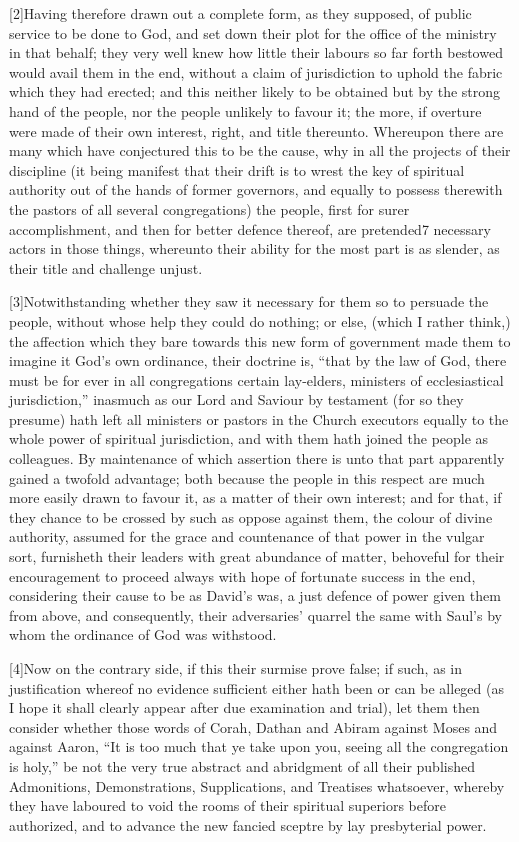 [2]Having therefore drawn out a complete form, as they supposed, of public service to be done to God, and set down their plot for the office of the ministry in that behalf; they very well knew how little their labours so far forth bestowed would avail them in the end, without a claim of jurisdiction to uphold the fabric which they had erected; and this neither likely to be obtained but by the strong hand of the people, nor the people unlikely to favour it; the more, if overture were made of their own interest, right, and title thereunto. Whereupon there are many which have conjectured this to be the cause, why in all the projects of their discipline (it being manifest that their drift is to wrest the key of spiritual authority out of the hands of former governors, and equally to possess therewith the pastors of all several congregations) the people, first for surer accomplishment, and then for better defence thereof, are pretended7 necessary actors in those things, whereunto their ability for the most part is as slender, as their title and challenge unjust.

[3]Notwithstanding whether they saw it necessary for them so to persuade the people,  without whose help they could do nothing; or else, (which I rather think,) the affection which they bare towards this new form of government made them to imagine it God’s own ordinance, their doctrine is, “that by the law of God, there must be for ever in all congregations certain lay-elders, ministers of ecclesiastical jurisdiction,” inasmuch as our Lord and Saviour by testament (for so they presume) hath left all ministers or pastors in the Church executors equally to the whole power of spiritual jurisdiction, and with them hath joined the people as colleagues. By maintenance of which assertion there is unto that part apparently gained a twofold advantage; both because the people in this respect are much more easily drawn to favour it, as a matter of their own interest; and for that, if they chance to be crossed by such as oppose against them, the colour of divine authority, assumed for the grace and countenance of that power in the vulgar sort, furnisheth their leaders with great abundance of matter, behoveful for their encouragement to proceed always with hope of fortunate success in the end, considering their cause to be as David’s was, a just defence of power given them from above, and consequently, their adversaries’ quarrel the same with Saul’s by whom the ordinance of God was withstood.

[4]Now on the contrary side, if this their surmise prove false; if such, as in justification whereof no evidence sufficient either hath been or can be alleged (as I hope it shall clearly appear after due examination and trial), let them then consider whether those words of Corah, Dathan and Abiram against Moses and against Aaron, “It is too much that ye take upon you, seeing all the congregation is holy,” be not the very true abstract and abridgment of all their published Admonitions, Demonstrations, Supplications, and Treatises whatsoever, whereby they have laboured to void the rooms of their spiritual superiors before authorized, and to advance the new fancied sceptre by lay presbyterial power.

